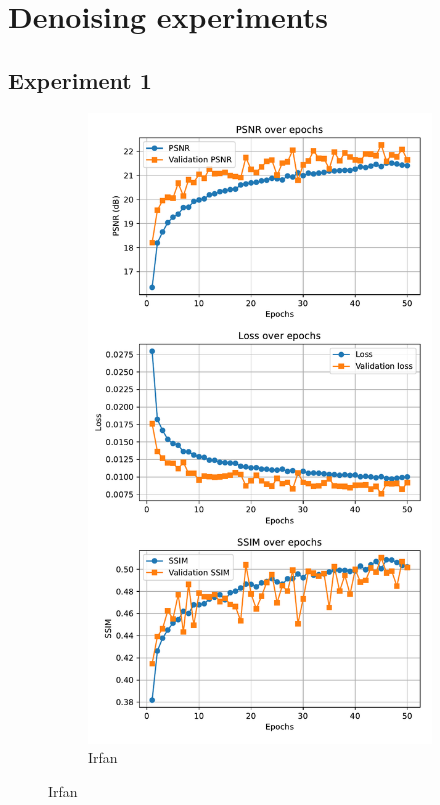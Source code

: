 
\newpage
\section{Denoising experiments}

\subsection{Experiment 1}
\begin{figure}[htbp]
    \centering
    \begin{subfigure}{\textwidth}
        \centering
        \includegraphics[height=0.9\textheight]{img/ch6/supervised/psnr_loss_irfan.pdf}
        \caption{Irfan}
        \label{fig:denoising-exp1-curves-irfan}
    \end{subfigure}
\end{figure}
